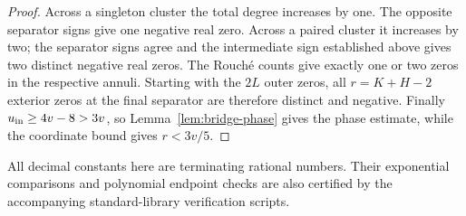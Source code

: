 \begin{proof}
Across a singleton cluster the total degree increases by one.
The opposite separator signs give one negative real zero.
Across a paired cluster it increases by two; the separator signs
agree and the intermediate sign established above gives two distinct
negative real zeros. The Rouch\'e counts give exactly one or two
zeros in the respective annuli. Starting with the $2L$ outer zeros,
all $r=K+H-2$ exterior zeros at the final separator are therefore
distinct and negative.
Finally $u_{\rm in}\ge4v-8>3v$, so Lemma~\ref{lem:bridge-phase}
gives the phase estimate, while the coordinate bound gives
$r<3v/5$.
\end{proof}

All decimal constants here are terminating rational numbers.
Their exponential comparisons and polynomial endpoint checks are also
certified by the accompanying standard-library verification scripts.
